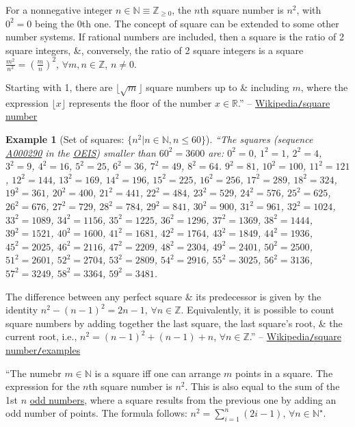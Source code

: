 \documentclass{article}
\newtheorem{example}{Example}
\begin{document}
For a nonnegative integer $n\in\mathbb{N}\equiv\mathbb{Z}_{\ge0}$, the $n$th square number is $n^2$, with $0^2 = 0$ being the 0th one. The concept of square can be extended to some other number systems. If rational numbers are included, then a square is the ratio of 2 square integers, \&, conversely, the ratio of 2 square integers is a square $\frac{m^2}{n^2} = \left(\frac{m}{n}\right)^2$, $\forall m,n\in\mathbb{Z}$, $n\ne0$.

Starting with 1, there are $\lfloor\sqrt{m}\rfloor$ square numbers up to \& including $m$, where the expression $\lfloor x\rfloor$ represents the floor of the number $x\in\mathbb{R}$.'' -- \href{https://en.wikipedia.org/wiki/Square_number}{Wikipedia\texttt{/}square number}

\begin{example}[Set of squares: $\{n^2|n\in\mathbb{N},n\le60\}$]
	``The squares (sequence \href{https://oeis.org/A000290}{A000290} in the \href{https://en.wikipedia.org/wiki/On-Line_Encyclopedia_of_Integer_Sequences}{OEIS}) smaller than $60^2 = 3600$ are: $0^2 = 0$, $1^2 = 1$, $2^2 = 4$, $3^2 = 9$, $4^2 = 16$, $5^2 = 25$, $6^2 = 36$, $7^2 = 49$, $8^2 = 64$. $9^2 = 81$, $10^2 = 100$, $11^2 = 121$, $12^2 = 144$, $13^2 = 169$, $14^2 = 196$, $15^2 = 225$, $16^2 = 256$, $17^2 = 289$, $18^2 = 324$, $19^2 = 361$, $20^2 = 400$, $21^2 = 441$, $22^2 = 484$, $23^2 = 529$, $24^2 = 576$, $25^2 = 625$, $26^2 =  676$, $27^2 = 729$, $28^2 = 784$, $29^2 = 841$, $30^2 = 900$, $31^2 = 961$, $32^2 = 1024$, $33^2 = 1089$, $34^2 = 1156$, $35^2 = 1225$, $36^2 = 1296$, $37^2 = 1369$, $38^2 = 1444$, $39^2 = 1521$, $40^2 = 1600$, $41^2 = 1681$, $42^2 = 1764$, $43^2 = 1849$, $44^2 = 1936$, $45^2 = 2025$, $46^2 = 2116$, $47^2 = 2209$, $48^2 = 2304$, $49^2 = 2401$, $50^2 = 2500$, $51^2 = 2601$, $52^2 = 2704$, $53^2 = 2809$, $54^2 = 2916$, $55^2 = 3025$, $56^2 = 3136$, $57^2 = 3249$, $58^2 = 3364$, $59^2 = 3481$.
\end{example}
The difference between any perfect square \& its predecessor is given by the identity $n^2 - (n - 1)^2 = 2n - 1$, $\forall n\in\mathbb{Z}$. Equivalently, it is possible to count square numbers by adding together the last square, the last square's root, \& the current root, i.e., $n^2 = (n - 1)^2 + (n - 1) + n$, $\forall n\in\mathbb{Z}$.'' -- \href{https://en.wikipedia.org/wiki/Square_number#Examples}{Wikipedia\texttt{/}square number\texttt{/}examples}

``The numebr $m\in\mathbb{N}$ is a square iff one can arrange $m$ points in a square. The expression for the $n$th square number is $n^2$. This is also equal to the sum of the 1st $n$ \href{https://en.wikipedia.org/wiki/Parity_(mathematics)}{odd numbers}, where a square results from the previous one by adding an odd number of points. The formula follows: $n^2 = \sum_{i=1}^n (2i - 1)$, $\forall n\in\mathbb{N}^\star$.
\end{document}
